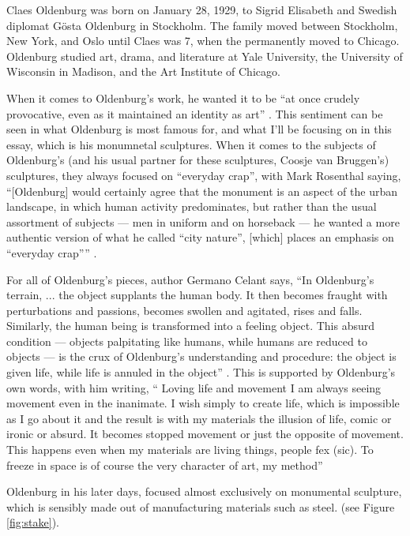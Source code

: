 \documentclass[12pt]{article}
\begin{document}
\vspace*{20pt}
\par Claes Oldenburg was born on January 28, 1929, to Sigrid Elisabeth and Swedish diplomat Gösta Oldenburg in Stockholm.
    The family moved between Stockholm, New York, and Oslo until Claes was 7, when the permanently moved to Chicago.
    Oldenburg studied art, drama, and literature at Yale University, the University of Wisconsin in Madison, and the Art Institute of Chicago. \autocite[1]{bio1}
\par When it comes to Oldenburg's work, he wanted it to be  ``at once crudely provocative, even as it maintained an identity as art'' \autocite[255]{bio2}.
    This sentiment can be seen in what Oldenburg is most famous for, and what I'll be focusing on in this essay, which is his monumnetal sculptures.
    When it comes to the subjects of Oldenburg's (and his usual partner for these sculptures, Coosje van Bruggen's) sculptures, they always focused on ``everyday crap'', with Mark Rosenthal saying, 
    ``[Oldenburg] would certainly agree that the monument is an aspect of the urban landscape, in which human activity predominates, but rather than the usual assortment of subjects --- men in uniform and on horseback --- he wanted a more authentic version of what he called ``city nature'', [which] places an emphasis on ``everyday crap'''' \autocite*[255]{bio2}.
\par For all of Oldenburg's pieces, author Germano Celant says, ``In Oldenburg's terrain, ... the object supplants the human body. It then becomes fraught with perturbations and passions,
    becomes swollen and agitated, rises and falls. Similarly, the human being is transformed into a feeling object. This absurd condition --- objects palpitating like humans, while humans are reduced to objects --- is the crux of Oldenburg's understanding and procedure: the object is given life, while life is annuled in the object'' \autocite*[13]{bio3}.
    This is supported by Oldenburg's own words, with him writing, `` Loving life and movement I am always seeing movement even in the inanimate. I wish simply to create life, which is impossible as I go about it and the result is with my materials the illusion of life, comic or ironic or absurd. It becomes stopped movement or just the opposite of movement. This happens even when my materials are living things, people fex (sic). To freeze in space is of course the very character of art, my method'' \autocite[7]{Oldenburg1}
\par Oldenburg in his later days, focused almost exclusively on monumental sculpture, which is sensibly made out of manufacturing materials such as steel. (see Figure \ref{fig:stake}).
\end{document}
